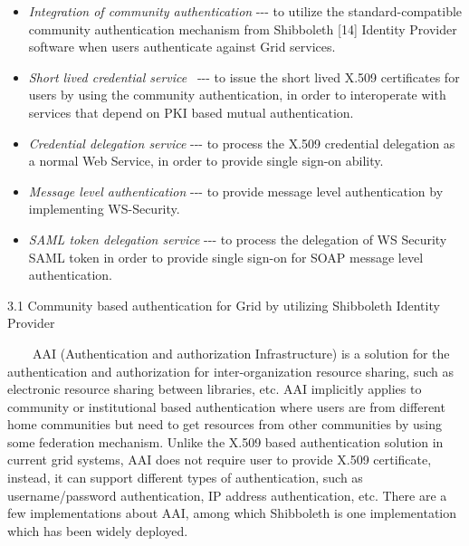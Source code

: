\documentclass{article}
\newcommand\liststyleLiv{%
\renewcommand\labelitemi{${\bullet}$}
\renewcommand\labelitemii{${\circ}$}
\renewcommand\labelitemiii{${\blacksquare}$}
\renewcommand\labelitemiv{${\bullet}$}
}
\begin{document}
\liststyleLiv
\begin{itemize}
\item \textit{Integration of community authentication} -{}-{}- to
utilize the standard-compatible community authentication mechanism from
Shibboleth [14] Identity Provider software when users authenticate
against Grid services.
\item \textit{Short lived credential service} \ {}-{}-{}- to issue the
short lived X.509 certificates for users by using the community
authentication, in order to interoperate with services that depend on
PKI based mutual authentication.
\item \textit{Credential delegation service} -{}-{}- to process the
X.509 credential delegation as a normal Web Service, in order to
provide single sign-on ability.
\item \textit{Message level authentication} -{}-{}- to provide message
level authentication by implementing WS-Security.
\item \textit{SAML token delegation service} -{}-{}- to process the
delegation of WS Security SAML token in order to provide single sign-on
for SOAP message level authentication.
\end{itemize}
3.1 Community based authentication for Grid by utilizing Shibboleth
Identity Provider

\ \ \ \ AAI (Authentication and authorization Infrastructure) is a
solution for the authentication and authorization for
inter-organization resource sharing, such as electronic resource
sharing between libraries, etc. AAI implicitly applies to community or
institutional based authentication where users are from different home
communities but need to get resources from other communities by using
some federation mechanism. Unlike the X.509 based authentication
solution in current grid systems, AAI does not require user to provide
X.509 certificate, instead, it can support different types of
authentication, such as username/password authentication, IP address
authentication, etc. There are a few implementations about AAI, among
which Shibboleth is one implementation which has been widely deployed.
\end{document}
